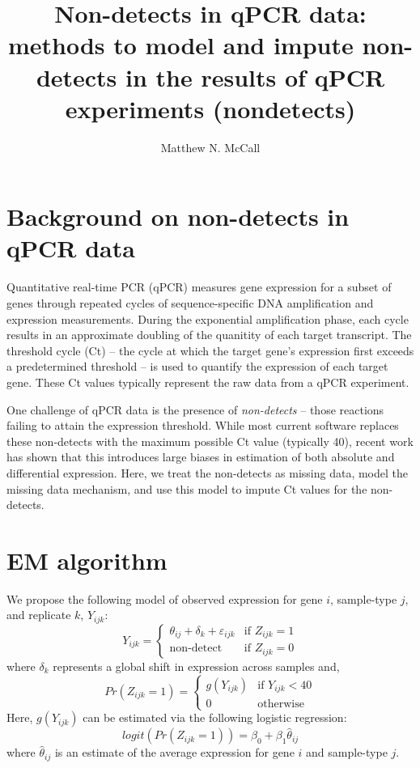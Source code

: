 \documentclass[12pt]{article}
\author{Matthew N. McCall}
\begin{document}
\title{Non-detects in qPCR data: methods to model and impute
  non-detects in the results of qPCR experiments (nondetects)}
\maketitle \tableofcontents

\section{Background on non-detects in qPCR data}
Quantitative real-time PCR (qPCR) measures gene expression for a
subset of genes through repeated cycles of sequence-specific DNA
amplification and expression measurements. During the exponential
amplification phase, each cycle results in an approximate doubling of
the quanitity of each target transcript. The threshold cycle (Ct) --
the cycle at which the target gene's expression first exceeds a
predetermined threshold -- is used to quantify the expression of each
target gene. These Ct values typically represent the raw data from a
qPCR experiment.

One challenge of qPCR data is the presence of \emph{non-detects} --
those reactions failing to attain the expression threshold. While most
current software replaces these non-detects with the maximum possible
Ct value (typically 40), recent work has shown that this introduces
large biases in estimation of both absolute and differential
expression. Here, we treat the non-detects as missing data, model the
missing data mechanism, and use this model to impute Ct values for the
non-detects.

\section{EM algorithm}
We propose the following model of observed expression for gene $i$,
sample-type $j$, and replicate $k$, $Y_{ijk}$:
\begin{displaymath}
Y_{ijk} = \left\{ \begin{array}{ll}
\theta_{ij} + \delta_{k} + \varepsilon_{ijk} & \textrm{if $Z_{ijk}=1$}\\
\textrm{non-detect} & \textrm{if $Z_{ijk}=0$}
\end{array} \right.
\end{displaymath}
where $\delta_{k}$ represents a global shift in expression across samples and,
\begin{displaymath}
Pr(Z_{ijk}=1) = \left\{ \begin{array}{ll}
g(Y_{ijk}) & \textrm{if $Y_{ijk} < 40$} \\
0 & \textrm{otherwise}
\end{array} \right.
\end{displaymath}
Here, $g(Y_{ijk})$ can be estimated via the following logistic regression:
\[
logit(Pr(Z_{ijk}=1)) =  \beta_0 + \beta_1 \hat{\theta}_{ij}
\]
where $\hat{\theta}_{ij}$ is an estimate of the average expression for
gene $i$ and sample-type $j$. 
\end{document}
